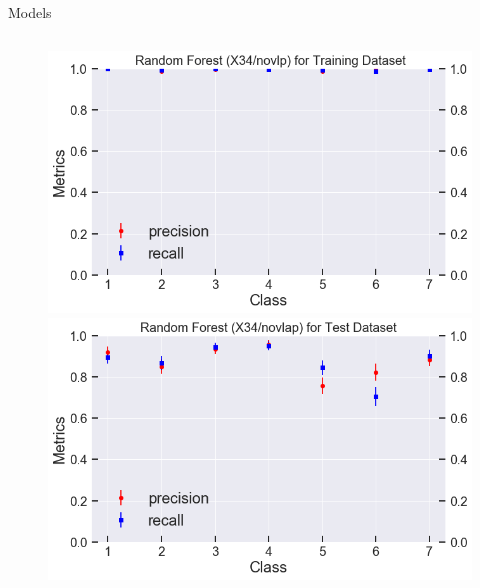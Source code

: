 \documentclass{if-beamer}
\begin{document}
\begin{frame}{Models}
\begin{columns}
\begin{column}{0.5\textwidth}
      \begin{figure}
            \includegraphics[scale=0.2]{./figs/rf_X34_train_default_score.png}
            \includegraphics[scale=0.2]{./figs/rf_X34_test_default_score.png}
            \end{figure} 
            
 \end{column}
 \end{columns}
\end{frame}



 
  
\end{document}
